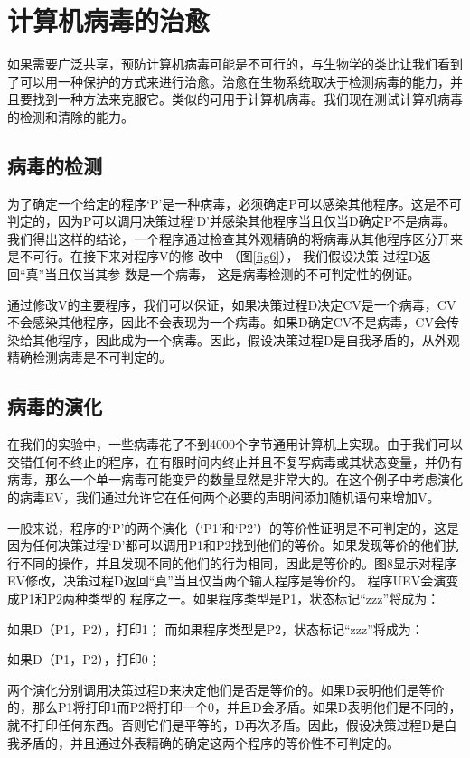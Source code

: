 \chapter{计算机病毒的治愈}

如果需要广泛共享，预防计算机病毒可能是不可行的，与生物学的类比让我们看到了可以用一种保护的方式来进行治愈。治愈在生物系统取决于检测病毒的能力，并且要找到一种方法来克服它。类似的可用于计算机病毒。我们现在测试计算机病毒的检测和清除的能力。

\section{病毒的检测}

为了确定一个给定的程序‘P’是一种病毒，必须确定P可以感染其他程序。这是不可判定的，因为P可以调用决策过程‘D’并感染其他程序当且仅当D确定P不是病毒。我们得出这样的结论，一个程序通过检查其外观精确的将病毒从其他程序区分开来是不可行。在接下来对程序V的修
改中
（图\ref{fig6}），
我们假设决策
过程D返回“真”当且仅当其参
数是一个病毒，
这是病毒检测的不可判定性的例证。


通过修改V的主要程序，我们可以保证，如果决策过程D决定CV是一个病毒，CV不会感染其他程序，因此不会表现为一个病毒。如果D确定CV不是病毒，CV会传染给其他程序，因此成为一个病毒。因此，假设决策过程D是自我矛盾的，从外观精确检测病毒是不可判定的。


\section{病毒的演化}

在我们的实验中，一些病毒花了不到4000个字节通用计算机上实现。由于我们可以交错任何不终止的程序，在有限时间内终止并且不复写病毒或其状态变量，并仍有病毒，那么一个单一病毒可能变异的数量显然是非常大的。在这个例子中考虑演化的病毒EV，我们通过允许它在任何两个必要的声明间添加随机语句来增加V。

一般来说，程序的‘P’的两个演化（‘P1’和‘P2’）的等价性证明是不可判定的，这是因为任何决策过程‘D’都可以调用P1和P2找到他们的等价。如果发现等价的他们执行不同的操作，并且发现不同的他们的行为相同，因此是等价的。图8显示对程序EV修改，决策过程D返回“真”当且仅当两个输入程序是等价的。
程序UEV会演变成P1和P2两种类型的
程序之一。如果程序类型是P1，状态标记“zzz”将成为：


如果D（P1，P2），打印1；
而如果程序类型是P2，状态标记“zzz”将成为：

如果D（P1，P2），打印0；

两个演化分别调用决策过程D来决定他们是否是等价的。如果D表明他们是等价的，那么P1将打印1而P2将打印一个0，并且D会矛盾。如果D表明他们是不同的，就不打印任何东西。否则它们是平等的，D再次矛盾。因此，假设决策过程D是自我矛盾的，并且通过外表精确的确定这两个程序的等价性不可判定的。

